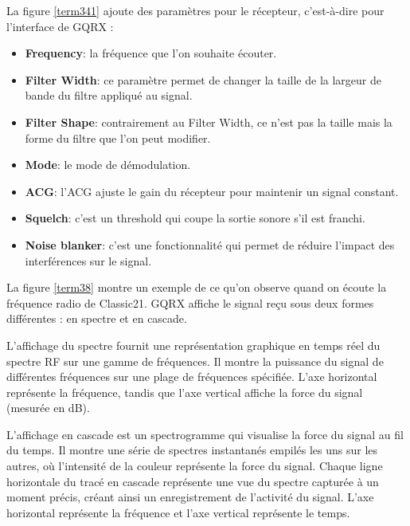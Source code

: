 \vspace{0.1cm}

La figure \ref{term341} ajoute des paramètres pour le récepteur, c'est-à-dire pour l'interface de GQRX :

\vspace{0.1cm}

\begin{itemize}
\item \textbf{Frequency}: la fréquence que l'on souhaite écouter.
\item \textbf{Filter Width}: ce paramètre permet de changer la taille de la largeur de bande du filtre appliqué au signal.
\item \textbf{Filter Shape}: contrairement au Filter Width, ce n'est pas la taille mais la forme du filtre que l'on peut modifier.
\item \textbf{Mode}: le mode de démodulation.
\item \textbf{\ac{ACG}}: l'\ac{ACG} ajuste le gain du récepteur pour maintenir un signal constant.
\item \textbf{Squelch}: c'est un threshold qui coupe la sortie sonore s'il est franchi.
\item \textbf{Noise blanker}: c'est une fonctionnalité qui permet de réduire l'impact des interférences sur le signal.
\end{itemize}

\vspace{0.1cm}

La figure \ref{term38} montre un exemple de ce qu'on observe quand on écoute la fréquence radio de Classic21. GQRX affiche le signal reçu sous deux formes différentes : en spectre et en cascade.

\vspace{0.1cm}

L'affichage du spectre fournit une représentation graphique en temps réel du spectre RF sur une gamme de fréquences.
Il montre la puissance du signal de différentes fréquences sur une plage de fréquences spécifiée.
L'axe horizontal représente la fréquence, tandis que l'axe vertical affiche la force du signal (mesurée en dB).

\vspace{0.1cm}

L'affichage en cascade est un spectrogramme qui visualise la force du signal au fil du temps.
Il montre une série de spectres instantanés empilés les uns sur les autres, où l'intensité de la couleur représente la force du signal.
Chaque ligne horizontale du tracé en cascade représente une vue du spectre capturée à un moment précis, créant ainsi un enregistrement de l'activité du signal.
L'axe horizontal représente la fréquence et l'axe vertical représente le temps.

